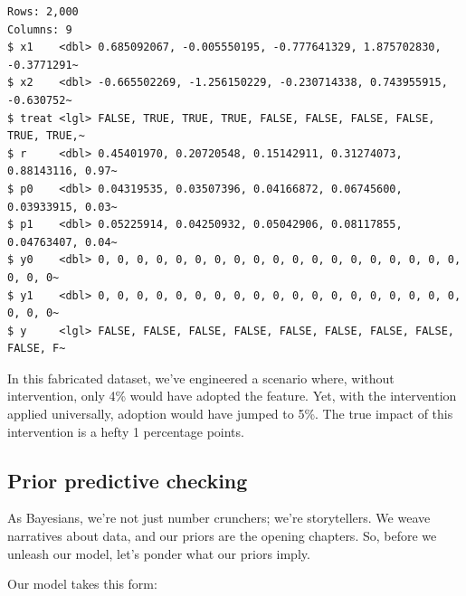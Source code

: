 \documentclass[
  letterpaper,
  DIV=11,
  numbers=noendperiod]{scrreprt}
\newenvironment{Shaded}{\begin{snugshade}}{\end{snugshade}}
\newcommand{\DecValTok}[1]{\textcolor[rgb]{0.68,0.00,0.00}{#1}}
\newcommand{\FunctionTok}[1]{\textcolor[rgb]{0.28,0.35,0.67}{#1}}
\newcommand{\NormalTok}[1]{\textcolor[rgb]{0.00,0.23,0.31}{#1}}
\newcommand{\OtherTok}[1]{\textcolor[rgb]{0.00,0.23,0.31}{#1}}
\newcommand{\SpecialCharTok}[1]{\textcolor[rgb]{0.37,0.37,0.37}{#1}}
\begin{document}
\begin{verbatim}
Rows: 2,000
Columns: 9
$ x1    <dbl> 0.685092067, -0.005550195, -0.777641329, 1.875702830, -0.3771291~
$ x2    <dbl> -0.665502269, -1.256150229, -0.230714338, 0.743955915, -0.630752~
$ treat <lgl> FALSE, TRUE, TRUE, TRUE, FALSE, FALSE, FALSE, FALSE, TRUE, TRUE,~
$ r     <dbl> 0.45401970, 0.20720548, 0.15142911, 0.31274073, 0.88143116, 0.97~
$ p0    <dbl> 0.04319535, 0.03507396, 0.04166872, 0.06745600, 0.03933915, 0.03~
$ p1    <dbl> 0.05225914, 0.04250932, 0.05042906, 0.08117855, 0.04763407, 0.04~
$ y0    <dbl> 0, 0, 0, 0, 0, 0, 0, 0, 0, 0, 0, 0, 0, 0, 0, 0, 0, 0, 0, 0, 0, 0~
$ y1    <dbl> 0, 0, 0, 0, 0, 0, 0, 0, 0, 0, 0, 0, 0, 0, 0, 0, 0, 0, 0, 0, 0, 0~
$ y     <lgl> FALSE, FALSE, FALSE, FALSE, FALSE, FALSE, FALSE, FALSE, FALSE, F~
\end{verbatim}

\begin{Shaded}
\end{Shaded}

In this fabricated dataset, we've engineered a scenario where, without
intervention, only 4\% would have adopted the feature. Yet, with the
intervention applied universally, adoption would have jumped to 5\%. The
true impact of this intervention is a hefty 1 percentage points.

\subsection{Prior predictive checking}\label{prior-predictive-checking}

As Bayesians, we're not just number crunchers; we're storytellers. We
weave narratives about data, and our priors are the opening chapters.
So, before we unleash our model, let's ponder what our priors imply.

Our model takes this form:
\end{document}
